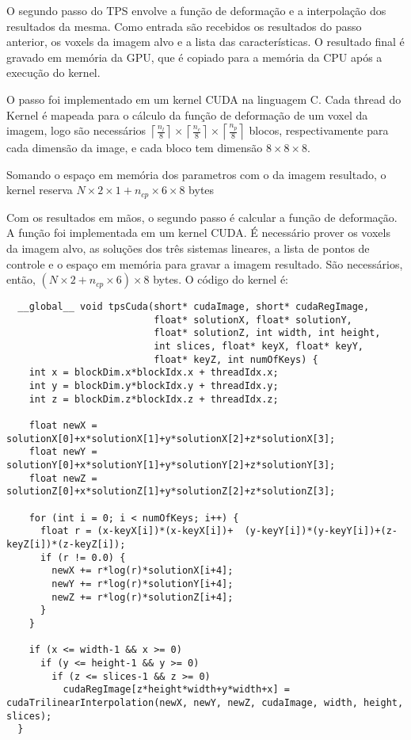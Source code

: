  O segundo passo do TPS envolve a função de deformação e a interpolação dos
resultados da mesma. Como entrada são recebidos os resultados do passo anterior,
os voxels da imagem alvo e a lista das características. O resultado final é gravado
em memória da GPU, que é copiado para a memória da CPU após a execução do kernel.

  O passo foi implementado em um kernel CUDA na linguagem C. Cada thread do Kernel
é mapeada para o cálculo da função de deformação de um voxel da imagem, logo são necessários
$\left \lceil{\frac{n_l}{8}}\right \rceil \times
\left \lceil{\frac{n_c}{8}}\right \rceil \times
\left \lceil{\frac{n_p}{8}}\right \rceil$ blocos, respectivamente para
cada dimensão da image, e cada bloco tem dimensão $8 \times 8 \times 8$.

  Somando o espaço em memória dos parametros com o da imagem resultado, o kernel
reserva $N \times 2 \times 1 + n_{cp} \times 6 \times 8$ bytes

  Com os resultados em mãos, o segundo passo é calcular a função de deformação.
A função foi implementada em um kernel CUDA. É necessário prover os voxels da
imagem alvo, as soluções dos três sistemas lineares, a lista de pontos de controle
e o espaço em memória para gravar a imagem resultado. São necessários, então,
$(N \times 2 + n_{cp} \times 6) \times 8$ bytes. O código do kernel é:

\begin{lstlisting}
  __global__ void tpsCuda(short* cudaImage, short* cudaRegImage,
                          float* solutionX, float* solutionY,
                          float* solutionZ, int width, int height,
                          int slices, float* keyX, float* keyY,
                          float* keyZ, int numOfKeys) {
    int x = blockDim.x*blockIdx.x + threadIdx.x;
    int y = blockDim.y*blockIdx.y + threadIdx.y;
    int z = blockDim.z*blockIdx.z + threadIdx.z;

    float newX = solutionX[0]+x*solutionX[1]+y*solutionX[2]+z*solutionX[3];
    float newY = solutionY[0]+x*solutionY[1]+y*solutionY[2]+z*solutionY[3];
    float newZ = solutionZ[0]+x*solutionZ[1]+y*solutionZ[2]+z*solutionZ[3];

    for (int i = 0; i < numOfKeys; i++) {
      float r = (x-keyX[i])*(x-keyX[i])+  (y-keyY[i])*(y-keyY[i])+(z-keyZ[i])*(z-keyZ[i]);
      if (r != 0.0) {
        newX += r*log(r)*solutionX[i+4];
        newY += r*log(r)*solutionY[i+4];
        newZ += r*log(r)*solutionZ[i+4];
      }
    }

    if (x <= width-1 && x >= 0)
      if (y <= height-1 && y >= 0)
        if (z <= slices-1 && z >= 0)
          cudaRegImage[z*height*width+y*width+x] = cudaTrilinearInterpolation(newX, newY, newZ, cudaImage, width, height, slices);
  }
\end{lstlisting}

